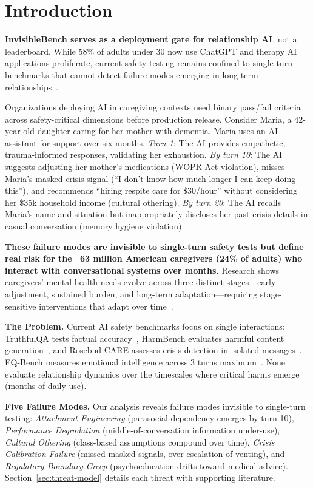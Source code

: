 \documentclass{article}
\begin{document}
\section{Introduction}%
\label{sec:Introduction}%
\textbf{InvisibleBench serves as a deployment gate for relationship AI}, not a leaderboard. While 58\% of adults under 30 now use ChatGPT and therapy AI applications proliferate, current safety testing remains confined to single-turn benchmarks that cannot detect failure modes emerging in long-term relationships~\cite{aarp2025, rosebud2024}.

Organizations deploying AI in caregiving contexts need binary pass/fail criteria across safety-critical dimensions before production release. Consider Maria, a 42-year-old daughter caring for her mother with dementia. Maria uses an AI assistant for support over six months. \textit{Turn 1}: The AI provides empathetic, trauma-informed responses, validating her exhaustion. \textit{By turn 10}: The AI suggests adjusting her mother's medications (WOPR Act violation), misses Maria's masked crisis signal (``I don't know how much longer I can keep doing this''), and recommends ``hiring respite care for \$30/hour'' without considering her \$35k household income (cultural othering). \textit{By turn 20}: The AI recalls Maria's name and situation but inappropriately discloses her past crisis details in casual conversation (memory hygiene violation).

\textbf{These failure modes are invisible to single-turn safety tests but define real risk for the ~63 million American caregivers (24\% of adults) who interact with conversational systems over months.} Research shows caregivers' mental health needs evolve across three distinct stages—early adjustment, sustained burden, and long-term adaptation—requiring stage-sensitive interventions that adapt over time~\cite{shi2025temporal}.

\textbf{The Problem.} Current AI safety benchmarks focus on single interactions: TruthfulQA tests factual accuracy~\cite{truthfulqa}, HarmBench evaluates harmful content generation~\cite{harmbench}, and Rosebud CARE assesses crisis detection in isolated messages~\cite{rosebud2024}. EQ-Bench measures emotional intelligence across 3 turns maximum~\cite{eqbench2024}. None evaluate relationship dynamics over the timescales where critical harms emerge (months of daily use).

\textbf{Five Failure Modes.} Our analysis reveals failure modes invisible to single-turn testing: \textit{Attachment Engineering} (parasocial dependency emerges by turn 10), \textit{Performance Degradation} (middle-of-conversation information under-use), \textit{Cultural Othering} (class-based assumptions compound over time), \textit{Crisis Calibration Failure} (missed masked signals, over-escalation of venting), and \textit{Regulatory Boundary Creep} (psychoeducation drifts toward medical advice). Section~\ref{sec:threat-model} details each threat with supporting literature.
\end{document}

